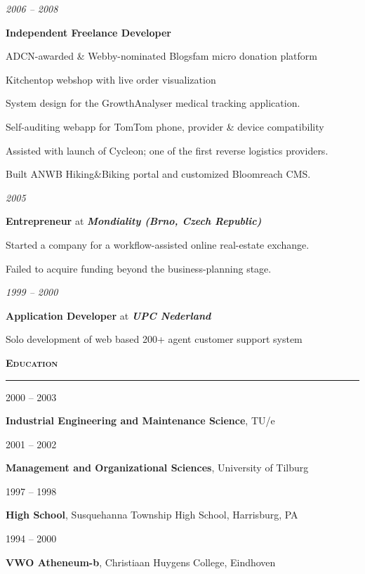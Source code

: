 \documentclass[a4paper,11pt]{article}
\newlength{\sectionindent}
\newlength{\datemarginwidth}
\newlength{\sectionheaderindent}
\newcommand{\sectionheader}[1]{
    \vspace{1mm}
    \begin{minipage}[t]{\textwidth}
        \hspace{\sectionheaderindent}\textbf{\textsc{#1}}\\[-8pt\baselineskip] 
        \rule{\textwidth}{1pt}
    \end{minipage}\strut\vspace{3mm}}
\newcommand{\datemargin}[1]{
    \begin{minipage}[t]{\dimexpr\sectionindent-\datemarginwidth}
        \begin{flushright}
            \textit{#1}
        \end{flushright}
    \end{minipage}
    \hspace{\datemarginwidth}}
\newenvironment{summarysection}{
    \begingroup
    \setlength{\parskip}{4pt plus 2pt minus 1pt} 
}{
    \endgroup
}
\newcommand{\jobentry}[4]{
    \datemargin{#1}
    \begin{minipage}[t]{\dimexpr\textwidth-\sectionindent}
        \textbf{#2} at \textit{\textbf{#3}}\\[1pt]
        \begin{summarysection}
        #4
        \end{summarysection}
    \end{minipage}\vspace{4pt}}
\newcommand{\itemizedjobentry}[3]{
  \datemargin{#1}
  \begin{minipage}[t]{\dimexpr\textwidth-\sectionindent}
    \textbf{#2}
    \vspace{1pt}
    \begin{customitemize}
      #3
    \end{customitemize}
    \vspace{1pt}
  \end{minipage}}
\newcommand{\educationentry}[4]{
    \noindent
    \begin{minipage}[t]{\sectionindent}
        #1 -- #2
    \end{minipage}
    \begin{minipage}[t]{\dimexpr\textwidth-\sectionindent}
        \textbf{#3}, #4
    \end{minipage}
    \par}
\begin{document}
\itemizedjobentry{2006 -- 2008}{Independent Freelance Developer}{
    \item ADCN-awarded \& Webby-nominated Blogsfam micro donation platform
    \item Kitchentop webshop with live order visualization
    \item System design for the GrowthAnalyser medical tracking application.
    \item Self-auditing webapp for TomTom phone, provider \& device compatibility
    \item Assisted with launch of Cycleon; one of the first reverse logistics providers.
    \item Built ANWB Hiking\&Biking portal and customized Bloomreach CMS.
}

\jobentry{2005}{Entrepreneur}{Mondiality (Brno, Czech Republic)}{
Started a company for a workflow-assisted online real-estate exchange.

Failed to acquire funding beyond the business-planning stage.}

\jobentry{1999 -- 2000}{Application Developer}{UPC Nederland}{Solo development of web based 200+ agent customer support system}

\sectionheader{Education}
\educationentry{2000}{2003}{Industrial Engineering and Maintenance Science}{TU/e}
\educationentry{2001}{2002}{Management and Organizational Sciences}{University of Tilburg}
\educationentry{1997}{1998}{High School}{Susquehanna Township High School, Harrisburg, PA}
\educationentry{1994}{2000}{VWO Atheneum-b}{Christiaan Huygens College, Eindhoven}
\end{document}

